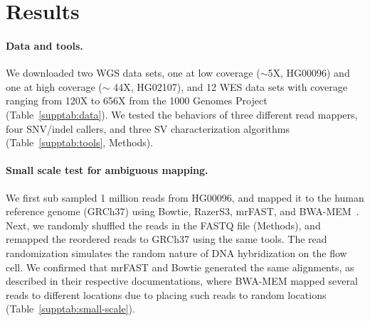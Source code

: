 \documentclass{bioinfo}
\begin{document}
\section{Results}

\paragraph{Data and tools.}
We downloaded two WGS data sets, one at low coverage ($\sim$5X, HG00096) and one at high coverage ($\sim$ 44X, HG02107), and 12 WES data sets with coverage ranging from 120X to 656X from the 1000 Genomes Project~\citep{1000GP2015}
(Table~\ref{supptab:data}). We tested the behaviors of 
three different read mappers, four SNV/indel callers, and three SV characterization algorithms (Table~\ref{supptab:tools}, Methods).

\paragraph{Small scale test for ambiguous mapping.}
We first sub sampled 1 million reads from HG00096, and mapped it to the human reference genome (GRCh37) using Bowtie, RazerS3, mrFAST, 
and BWA-MEM~\citep{Li2013}.
Next, we randomly shuffled the reads in the FASTQ file (Methods), and remapped the reordered reads to GRCh37 using the same tools. The read randomization simulates the random nature of DNA hybridization on the flow cell.
We confirmed that mrFAST and 
Bowtie generated the same alignments,
as described in 
their respective documentations, 
where BWA-MEM mapped several reads to different locations due to placing 
such reads to random locations (Table~\ref{supptab:small-scale}).
\end{document}
